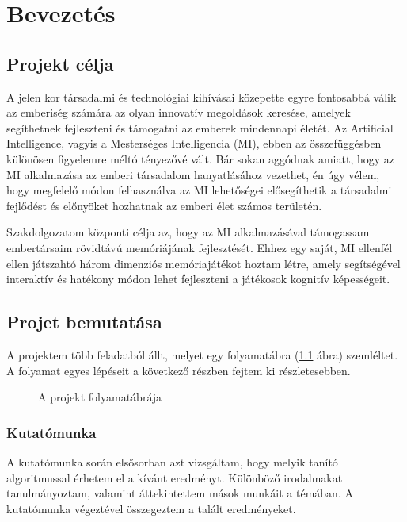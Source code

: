 \chapter{Bevezetés}
\usetikzlibrary{shapes,arrows}

\thispagestyle{fancy}
\pagestyle{fancy}
\section{Projekt célja}
A jelen kor társadalmi és technológiai kihívásai közepette egyre fontosabbá válik az emberiség számára az olyan innovatív megoldások keresése, amelyek segíthetnek fejleszteni és támogatni az emberek mindennapi életét.
Az Artificial Intelligence, vagyis a Mesterséges Intelligencia  (MI), ebben az összefüggésben különösen figyelemre méltó tényezővé vált. 
Bár sokan aggódnak amiatt, hogy az MI alkalmazása az emberi társadalom hanyatlásához vezethet, én úgy vélem, hogy  megfelelő módon felhasználva az MI lehetőségei elősegíthetik a társadalmi fejlődést és előnyöket hozhatnak az emberi élet számos területén.

Szakdolgozatom központi célja az, hogy az MI alkalmazásával támogassam embertársaim rövidtávú memóriájának fejlesztését.
Ehhez egy saját, MI ellenfél ellen játszahtó három dimenziós memóriajátékot hoztam létre, amely segítségével interaktív és hatékony módon lehet fejleszteni a játékosok kognitív képességeit. 
\section{Projet bemutatása}

A projektem több feladatból állt, melyet egy folyamatábra (\ref{fig:folyamat_diagram} ábra) szemléltet. A folyamat egyes lépéseit a következő részben fejtem ki részletesebben.
\begin{figure}[H]
    \centering
    
    \caption{A projekt folyamatábrája}
    \label{fig:folyamat_diagram}
\end{figure}

\subsection{Kutatómunka}
A kutatómunka során elsősorban azt vizsgáltam, hogy melyik tanító algoritmussal érhetem el a kívánt eredményt. Különböző irodalmakat tanulmányoztam, valamint áttekintettem mások munkáit a témában. A kutatómunka végeztével összegeztem a talált eredményeket.

